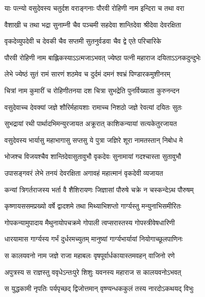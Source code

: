 


\twolineshloka
{याः पत्न्यो वसुदेवस्य चतुर्दश वराङ्गनाः}
{पौरवी रोहिणी नाम इन्दिरा च तथा वरा} %

\twolineshloka
{वैशाखी च तथा भद्रा सुनाम्नी चैव पञ्चमी}
{सहदेवा शान्तिदेवा श्रीदेवा देवरक्षिता} %

\twolineshloka
{वृकदेव्युपदेवी च देवकी चैव सप्तमी}
{सुतनुर्वडवा चैव द्वे एते परिचारिके} %

\twolineshloka
{पौरवी रोहिणी नाम बाह्लिकस्याऽऽत्मजाऽभवत्}
{ज्येष्ठा पत्नी महाराज दयिताऽऽनकदुन्दुभेः} %

\twolineshloka
{लेभे ज्येष्ठं सुतं रामं सारणं शठमेव च}
{दुर्दमं दमनं श्वभ्रं पिण्डारकमुशीनरम्} %

\twolineshloka
{चित्रां नाम कुमारीं च रोहिणीतनया दश}
{चित्रा सुभद्रेति पुनर्विख्याता कुरुनन्दन} %

\twolineshloka
{वसुदेवाच्च देवक्यां जज्ञे शौरिर्महायशाः}
{रामाच्च निशठो जज्ञे रेवत्यां दयितः सुतः} %

\twolineshloka
{सुभद्रायां रथी पार्थादभिमन्युरजायत}
{अक्रूरात् काशिकन्यायां सत्यकेतुरजायत} %

\twolineshloka
{वसुदेवस्य भार्यासु महाभागासु सप्तसु}
{ये पुत्रा जज्ञिरे शूरा नामतस्तान् निबोध मे} %

\twolineshloka
{भोजश्च विजयश्चैव शान्तिदेवासुतावुभौ}
{वृकदेवः सुनामायां गदश्चास्ता सुतावुभौ} %

\twolineshloka
{उपासङ्गवरं लेभे तनयं देवरक्षिता}
{अगावहं महात्मानं वृकदेवी व्यजायत} %

\twolineshloka
{कन्यां त्रिगर्तराजस्य भर्ता वै शैशिरायणः}
{जिज्ञासां पौरुषे चक्रे न चस्कन्देऽथ पौरुषम्} %

\twolineshloka
{कृष्णायससमप्रख्यो वर्षे द्वादशमे तथा}
{मिथ्याभिशप्तो गार्ग्यस्तु मन्युनाभिसमीरितः} %

\twolineshloka
{गोपकन्यामुपादाय मैथुनायोपचक्रमे}
{गोपाली त्वप्सरास्तस्य गोपस्त्रीवेषधारिणी} %

\twolineshloka
{धारयामास गार्ग्यस्य गर्भं दुर्धरमच्युतम्}
{मानुष्यां गार्ग्यभार्यायां नियोगाच्छूलपाणिनः} %

\twolineshloka
{स कालयवनो नाम जज्ञे राजा महाबलः}
{वृषपूर्वार्धकायास्तमवहन् वाजिनो रणे} %

\twolineshloka
{अपुत्रस्य स राज्ञस्तु ववृधेऽन्तःपुरे शिशुः}
{यवनस्य महाराज स कालयवनोऽभवत्} %

\twolineshloka
{स युद्धकामी नृपतिः पर्यपृच्छद् द्विजोत्तमान्}
{वृष्ण्यन्धककुलं तस्य नारदोऽकथयद् विभुः} %

